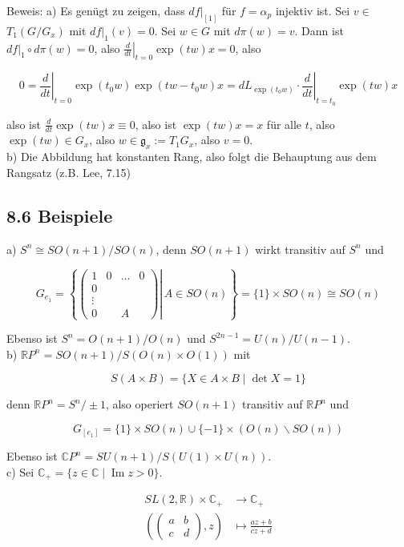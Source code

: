 \documentclass[10pt, letterpaper]{article}
\begin{document}
Beweis: a) Es genügt zu zeigen, dass $\left.d f\right|_{[1]}$ für $f=\alpha_{p}$ injektiv ist. Sei $v \in$ $T_{1}\left(G / G_{x}\right)$ mit $\left.d f\right|_{1}(v)=0$. Sei $w \in G$ mit $d \pi(w)=v$. Dann ist $\left.d f\right|_{1} \circ d \pi(w)=0$, also $\left.\frac{d}{d t}\right|_{t=0} \exp (t w) x=0$, also

$$
0=\left.\frac{d}{d t}\right|_{t=0} \exp \left(t_{0} w\right) \exp \left(t w-t_{0} w\right) x=\left.d L_{\exp \left(t_{0} w\right)} \cdot \frac{d}{d t}\right|_{t=t_{0}} \exp (t w) x
$$

also ist $\frac{d}{d t} \exp (t w) x \equiv 0$, also ist $\exp (t w) x=x$ für alle $t$, also $\exp (t w) \in G_{x}$, also $w \in \mathfrak{g}_{x}:=T_{1} G_{x}$, also $v=0$.\\
b) Die Abbildung hat konstanten Rang, also folgt die Behauptung aus dem Rangsatz (z.B. Lee, 7.15)

\subsection*{8.6 Beispiele}
a) $S^{n} \cong S O(n+1) / S O(n)$, denn $S O(n+1)$ wirkt transitiv auf $S^{n}$ und

$$
G_{e_{1}}=\left\{\left.\left(\begin{array}{cccc}
1 & 0 & \ldots & 0 \\
0 & & & \\
\vdots & & & \\
0 & & A &
\end{array}\right) \right\rvert\, A \in S O(n)\right\}=\{1\} \times S O(n) \cong S O(n)
$$

Ebenso ist $S^{n}=O(n+1) / O(n)$ und $S^{2 n-1}=U(n) / U(n-1)$.\\
b) $\mathbb{R} P^{n}=S O(n+1) / S(O(n) \times O(1))$ mit

$$
S(A \times B)=\{X \in A \times B \mid \operatorname{det} X=1\}
$$

denn $\mathbb{R} P^{n}=S^{n} / \pm 1$, also operiert $S O(n+1)$ transitiv auf $\mathbb{R} P^{n}$ und

$$
G_{\left[e_{1}\right]}=\{1\} \times S O(n) \cup\{-1\} \times(O(n) \backslash S O(n))
$$

Ebenso ist $\mathbb{C} P^{n}=S U(n+1) / S(U(1) \times U(n))$.\\
c) Sei $\mathbb{C}_{+}=\{z \in \mathbb{C} \mid \operatorname{Im} z>0\}$.

$$
\begin{aligned}
S L(2, \mathbb{R}) \times \mathbb{C}_{+} & \rightarrow \mathbb{C}_{+} \\
\left(\left(\begin{array}{ll}
a & b \\
c & d
\end{array}\right), z\right) & \mapsto \frac{a z+b}{c z+d}
\end{aligned}
$$
\end{document}
